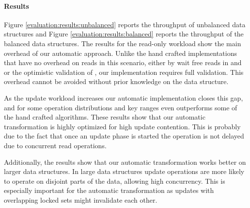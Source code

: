 \paragraph{Results} Figure \ref{evaluation:results:unbalanced} 
reports the throughput of unbalanced data structures and Figure 
\ref{evaluation:results:balanced} reports
the throughput of the balanced data structures. 
The results for the read-only workload show the main overhead
of our automatic approach. Unlike the hand crafted implementations
that have no overhead on reads in this scenario, either by wait free reads in
\danaTree and \danaAVL or the optimistic validation of \bronson, 
our implementation requires full \readSet validation.
This overhead cannot be avoided without prior knowledge on the
data structure.
 
As the update workload increases our automatic implementation 
closes this gap, and for some operation distributions and 
key ranges even outperforms some of the hand crafted algorithms.
These results show that our automatic transformation is highly optimized for
high update contention. This is probably due to the fact that once
an update phase is started the operation is not delayed due to concurrent 
read operations. 

Additionally, the results show that our automatic transformation 
works better on larger data structures. In large data structures 
update operations are more likely to operate on disjoint parts of 
the data, allowing high concurrency. This is especially important 
for the automatic transformation as updates  with overlapping 
locked sets might invalidate each other.  
 


\begin{figure*}
\begin{center}

\end{center}
\caption{Throughput of unbalanced data
structures.
y-axis show the throughput (operations/sec), 
and x-axis show the number of threads.
\label{evaluation:results:unbalanced}}
\end{figure*}


\begin{figure*}
\begin{center}


\end{center}
\caption{Throughput of balanced data
structures.
y-axis show the throughput (operations/sec), 
and x-axis show the number of threads.
\label{evaluation:results:balanced}}
\end{figure*}